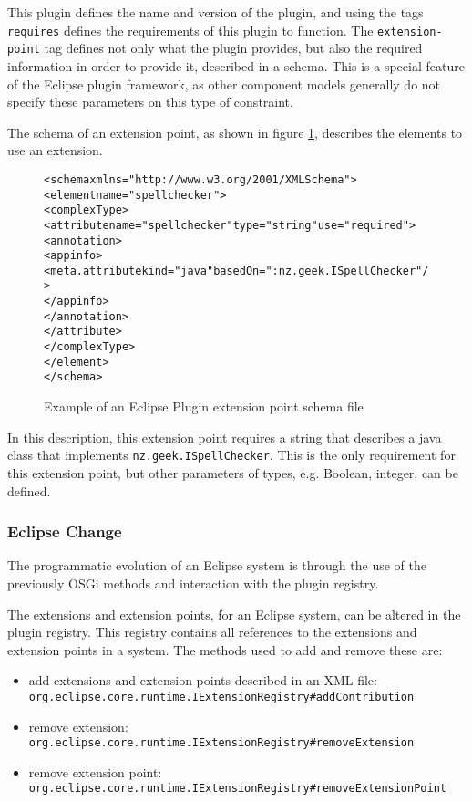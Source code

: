 This plugin defines the name and version of the plugin, and using the tags \texttt{requires} defines the requirements of this plugin to function.
The \texttt{extension-point} tag defines not only what the plugin provides, but also the required information in order to provide it, described in a schema.
This is a special feature of the Eclipse plugin framework, as other component models generally do not specify these parameters on this type of constraint. 

The schema of an extension point, as shown in figure \ref{eclipseextensionschema}, describes the elements to use an extension.

\begin{figure}[htp]
\begin{center}
\begin{alltt}
<schema xmlns="http://www.w3.org/2001/XMLSchema">
 <element name="spellchecker">
  <complexType>
   <attribute name="spellchecker" type="string" use="required">
    <annotation>
     <appinfo>
      <meta.attribute kind="java" basedOn=":nz.geek.ISpellChecker"/>
     </appinfo>
    </annotation>
   </attribute>
  </complexType>
 </element>
</schema>
\end{alltt}
  \caption[Eclipse Plugin extension point schema]{Example of an Eclipse Plugin extension point schema file}
  \label{eclipseextensionschema}
\end{center}
\end{figure}

In this description, this extension point requires a string that describes a java class that implements \texttt{nz.geek.ISpellChecker}.
This is the only requirement for this extension point, but other parameters of types, e.g. Boolean, integer, can be defined.

\subsubsection{Eclipse Change}
The programmatic evolution of an Eclipse system is through the use of the previously OSGi methods and interaction with the plugin registry.

The extensions and extension points, for an Eclipse system, can be altered in the plugin registry.
This registry contains all references to the extensions and extension points in a system.
The methods used to add and remove these are:

\begin{itemize}
  \item add extensions and extension points described in an XML file: \\ \texttt{org.eclipse.core.runtime.IExtensionRegistry}\verb+#+\texttt{addContribution}
  \item remove extension: \\ \texttt{org.eclipse.core.runtime.IExtensionRegistry}\verb+#+\texttt{removeExtension}
  \item remove extension point:\\ \texttt{org.eclipse.core.runtime.IExtensionRegistry}\verb+#+\texttt{removeExtensionPoint}
\end{itemize}



